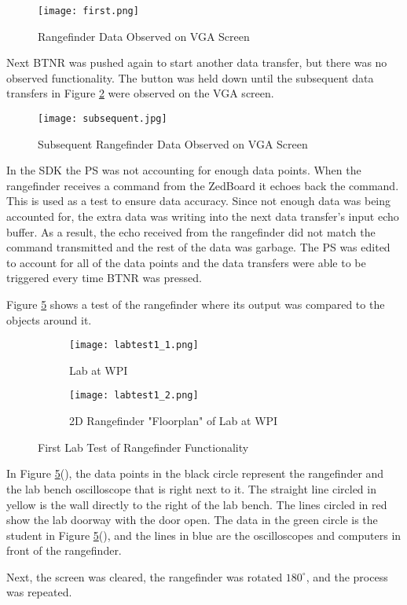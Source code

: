 \begin{figure}[H]
	\centerline{\texttt{[image: first.png]}}
	\caption{Rangefinder Data Observed on VGA Screen}
	\label{first}
\end{figure}

Next BTNR was pushed again to start another data transfer, but there was no observed functionality. The button was held down until the subsequent data transfers in Figure \ref{subsequent} were observed on the VGA screen.

\begin{figure}[H]
	\centerline{\texttt{[image: subsequent.jpg]}}
	\caption{Subsequent Rangefinder Data Observed on VGA Screen}
	\label{subsequent}
\end{figure}

In the SDK the PS was not accounting for enough data points. When the rangefinder receives a command from the ZedBoard it echoes back the command. This is used as a test to ensure data accuracy. Since not enough data was being accounted for, the extra data was writing into the next data transfer's input echo buffer. As a result, the echo received from the rangefinder did not match the command transmitted and the rest of the data was garbage. The PS was edited to account for all of the data points and the data transfers were able to be triggered every time BTNR was pressed.
\par
Figure \ref{labtest1} shows a test of the rangefinder where its output was compared to the objects around it.

\begin{figure}[H] 
	\begin{subfigure}{1\textwidth}
	\centering
		\texttt{[image: labtest1\_1.png]}
		\caption{Lab at WPI}
		\label{lab1}
	\end{subfigure}
	\begin{subfigure}{1\textwidth}
	\centering
		\texttt{[image: labtest1\_2.png]}
		\caption{2D Rangefinder "Floorplan" of Lab at WPI}
		\label{floorplan1}
	\end{subfigure}
	\caption{First Lab Test of Rangefinder Functionality}
	\label{labtest1}
\end{figure}

In Figure \ref{labtest1}(), the data points in the black circle represent the rangefinder and the lab bench oscilloscope that is right next to it. The straight line circled in yellow is the wall directly to the right of the lab bench. The lines circled in red show the lab doorway with the door open. The data in the green circle is the student in Figure \ref{labtest1}(), and the lines in blue are the oscilloscopes and computers in front of the rangefinder.
\par
Next, the screen was cleared, the rangefinder was rotated $180^\circ$, and the process was repeated.

